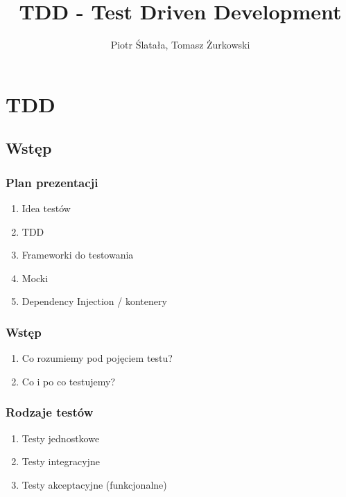 \documentclass[slidestop,compress,mathserif]{beamer}
\title{TDD - Test Driven Development}
\author{Piotr Ślatała, Tomasz Żurkowski}
\begin{document}
\section{TDD}

\subsection{Wstęp}
\frame{
 \titlepage
}

\begin{frame}
 \frametitle{Plan prezentacji}
 \begin{enumerate}
 \item Idea testów
 \pause \item TDD
 \pause \item Frameworki do testowania
 \pause \item Mocki
 \pause \item Dependency Injection / kontenery
\end{enumerate}

\end{frame}


\begin{frame}
 \frametitle{Wstęp}
\begin{enumerate}
 \item Co rozumiemy pod pojęciem testu? %
 \pause \item Co i po co testujemy? %
\end{enumerate}
\end{frame}

\begin{frame}
\frametitle{Rodzaje testów}
 \begin{enumerate}
  \item Testy jednostkowe
  \pause \item Testy integracyjne
  \pause \item Testy akceptacyjne (funkcjonalne)
\end{enumerate}
\end{frame}
\end{document}
